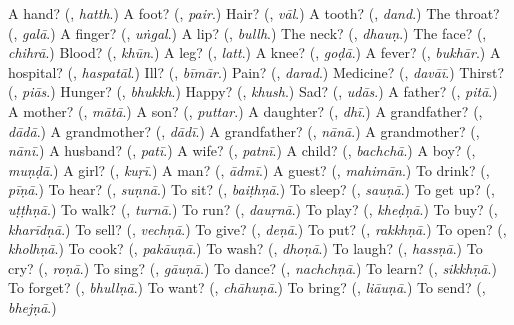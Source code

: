 \begin{tcolorbox}[breakable,colback=teal!4,colframe=teal!35!black,title={Before you move on}]
A hand? (\textbf{}, \emph{hatth}.) A foot? (\textbf{}, \emph{pair}.) Hair? (\textbf{}, \emph{vāl}.) A tooth? (\textbf{}, \emph{dand}.) The throat? (\textbf{}, \emph{galā}.) A finger? (\textbf{}, \emph{uṅgal}.) A lip? (\textbf{}, \emph{bullh}.) The neck? (\textbf{}, \emph{dhauṇ}.) The face? (\textbf{}, \emph{chihrā}.) Blood? (\textbf{}, \emph{khūn}.) A leg? (\textbf{}, \emph{latt}.) A knee? (\textbf{}, \emph{goḍā}.) A fever? (\textbf{}, \emph{bukhār}.) A hospital? (\textbf{}, \emph{haspatāl}.) Ill? (\textbf{}, \emph{bīmār}.) Pain? (\textbf{}, \emph{darad}.) Medicine? (\textbf{}, \emph{davāī}.) Thirst? (\textbf{}, \emph{piās}.) Hunger? (\textbf{}, \emph{bhukkh}.) Happy? (\textbf{}, \emph{khush}.) Sad? (\textbf{}, \emph{udās}.) A father? (\textbf{}, \emph{pitā}.) A mother? (\textbf{}, \emph{mātā}.) A son? (\textbf{}, \emph{puttar}.) A daughter? (\textbf{}, \emph{dhī}.) A grandfather? (\textbf{}, \emph{dādā}.) A grandmother? (\textbf{}, \emph{dādī}.) A grandfather? (\textbf{}, \emph{nānā}.) A grandmother? (\textbf{}, \emph{nānī}.) A husband? (\textbf{}, \emph{patī}.) A wife? (\textbf{}, \emph{patnī}.) A child? (\textbf{}, \emph{bachchā}.) A boy? (\textbf{}, \emph{muṇḍā}.) A girl? (\textbf{}, \emph{kuṛī}.) A man? (\textbf{}, \emph{ādmī}.) A guest? (\textbf{}, \emph{mahimān}.) To drink? (\textbf{}, \emph{pīṇā}.) To hear? (\textbf{}, \emph{suṇnā}.) To sit? (\textbf{}, \emph{baiṭhṇā}.) To sleep? (\textbf{}, \emph{sauṇā}.) To get up? (\textbf{}, \emph{uṭṭhṇā}.) To walk? (\textbf{}, \emph{turnā}.) To run? (\textbf{}, \emph{dauṛnā}.) To play? (\textbf{}, \emph{kheḍṇā}.) To buy? (\textbf{}, \emph{kharīdṇā}.) To sell? (\textbf{}, \emph{vechṇā}.) To give? (\textbf{}, \emph{deṇā}.) To put? (\textbf{}, \emph{rakkhṇā}.) To open? (\textbf{}, \emph{kholhṇā}.) To cook? (\textbf{}, \emph{pakāuṇā}.) To wash? (\textbf{}, \emph{dhoṇā}.) To laugh? (\textbf{}, \emph{hassṇā}.) To cry? (\textbf{}, \emph{roṇā}.) To sing? (\textbf{}, \emph{gāuṇā}.) To dance? (\textbf{}, \emph{nachchṇā}.) To learn? (\textbf{}, \emph{sikkhṇā}.) To forget? (\textbf{}, \emph{bhullṇā}.) To want? (\textbf{}, \emph{chāhuṇā}.) To bring? (\textbf{}, \emph{liāuṇā}.) To send? (\textbf{}, \emph{bhejṇā}.)
\end{tcolorbox}
